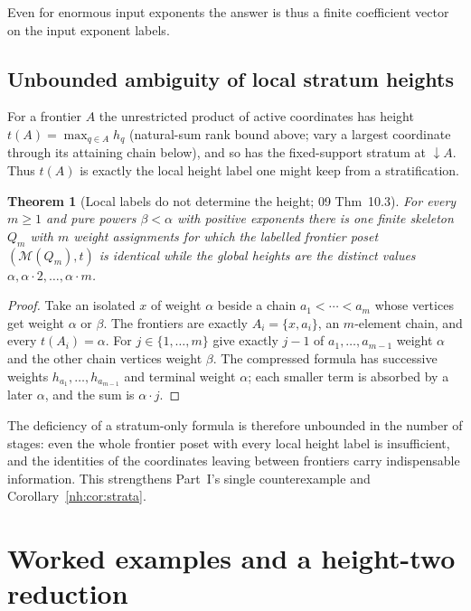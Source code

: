 \documentclass[11pt,a4paper]{article}
\newtheorem{theorem}{Theorem}[section]
\theoremstyle{definition}
\theoremstyle{remark}
\newcommand{\M}{\mathcal M}
\begin{document}
Even for enormous input exponents the answer is thus a finite coefficient vector
on the input exponent labels.

\subsection{Unbounded ambiguity of local stratum heights}\label{nh:wpo:sec:ambiguity}

For a frontier $A$ the unrestricted product of active coordinates has height
$t(A)=\max_{q\in A}h_q$ (natural-sum rank bound above; vary a largest coordinate
through its attaining chain below), and so has the fixed-support stratum at
${\downarrow}A$. Thus $t(A)$ is exactly the local height label one might keep
from a stratification.

\begin{theorem}[Local labels do not determine the height; 09 Thm~10.3]
\label{nh:wpo:thm:ambiguity}
For every $m\ge1$ and pure powers $\beta<\alpha$ with positive exponents there is
one finite skeleton $Q_m$ with $m$ weight assignments for which the labelled
frontier poset $(\M(Q_m),t)$ is identical while the global heights are the
distinct values $\alpha,\alpha\cdot2,\dots,\alpha\cdot m$.
\end{theorem}
\begin{proof}
Take an isolated $x$ of weight $\alpha$ beside a chain $a_1<\cdots<a_m$ whose
vertices get weight $\alpha$ or $\beta$. The frontiers are exactly
$A_i=\{x,a_i\}$, an $m$-element chain, and every $t(A_i)=\alpha$. For
$j\in\{1,\dots,m\}$ give exactly $j-1$ of $a_1,\dots,a_{m-1}$ weight $\alpha$ and
the other chain vertices weight $\beta$. The compressed formula has successive
weights $h_{a_1},\dots,h_{a_{m-1}}$ and terminal weight $\alpha$; each smaller
term is absorbed by a later $\alpha$, and the sum is $\alpha\cdot j$.
\end{proof}

The deficiency of a stratum-only formula is therefore unbounded in the number of
stages: even the whole frontier poset with every local height label is
insufficient, and the identities of the coordinates leaving between frontiers
carry indispensable information. This strengthens Part~I's single counterexample
and Corollary~\ref{nh:cor:strata}.

\section{Worked examples and a height-two reduction}\label{nh:wpo:sec:examples}
\end{document}
